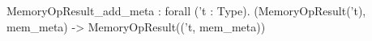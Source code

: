 MemoryOpResult_add_meta : forall ('t : Type). (MemoryOpResult('t), mem_meta) -> MemoryOpResult(('t, mem_meta))